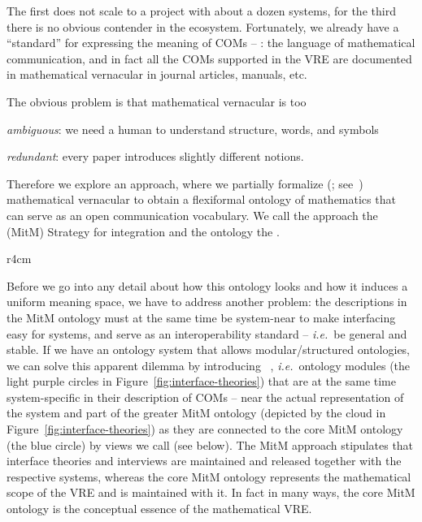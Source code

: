 The first does not scale to a project with about a dozen systems, for the third there is
no obvious contender in the \ODK ecosystem. Fortunately, we already have a ``standard'' for
expressing the meaning of COMs -- : the language of
mathematical communication, and in fact all the COMs supported in the \ODK VRE are documented
in mathematical vernacular in journal articles, manuals, etc.

The obvious problem is that mathematical vernacular is too 
\begin{inparaenum}[\em i\rm)]
\item \emph{ambiguous}: we need a human to understand structure, words, and symbols
\item \emph{redundant}: every paper introduces slightly different notions. 
\end{inparaenum}

Therefore we explore an approach, where we partially formalize (;
see~\cite{Kohlhase:tffm13}) mathematical vernacular to obtain a flexiformal ontology of
mathematics that can serve as an open communication vocabulary. We call the approach the
 (MitM) Strategy for integration and the ontology the .

\begin{wrapfigure}r{4cm}\vspace*{-1.5em}
  \vspace*{-.5em}
  \caption{Interface theories}\label{fig:interface-theories}\vspace*{-1em}
\end{wrapfigure}
Before we go into any detail about how this ontology looks and how it induces a uniform
meaning space, we have to address another problem: the descriptions in the MitM ontology
must at the same time be system-near to make interfacing easy for systems, and serve as
an interoperability standard -- \emph{i.e.}\ be general and stable. If we have an ontology system
that allows modular/structured ontologies, we can solve this apparent dilemma by
introducing ~\cite{KohRabSac:fvip11}, \emph{i.e.}\ ontology modules
(the light purple circles in Figure~\ref{fig:interface-theories}) that are at the same
time system-specific in their description of COMs -- near the actual representation of the
system and part of the greater MitM ontology (depicted by the cloud in
Figure~\ref{fig:interface-theories}) as they are connected to the core MitM ontology (the
blue circle) by views we call  (see below). The MitM approach
stipulates that interface theories and interviews are maintained and released together with
the respective systems, whereas the core MitM ontology represents the mathematical scope
of the VRE and is maintained with it. In fact in many ways, the core MitM ontology is the
conceptual essence of the mathematical VRE.

